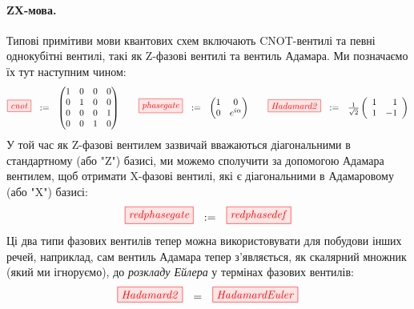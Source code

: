 \documentclass[11pt]{article}
\theoremstyle{definition}
\def\bR{\begin{color}{red}}
\def\e{\end{color}\xspace}
\begin{document}
\paragraph{ZX-мова.} Типові примітиви мови квантових схем включають CNOT-вентилі та певні однокубітні вентилі, такі як Z-фазові вентилі та вентиль Адамара. Ми позначаємо їх тут наступним чином:
\[
\tikzfig{cnot}\ \ :=\ \ \left( \begin{matrix}
  1 & 0 & 0 & 0 \\
  0 & 1 & 0 & 0 \\ 
  0 & 0 & 0 & 1 \\
  0 & 0 & 1 & 0
\end{matrix} \right) 
\qquad
\tikzfig{phasegate}\ \ :=\ \  
\left(\begin{matrix}
1 & 0 \\
0 & e^{i \alpha}
\end{matrix}\right) 
\qquad
\tikzfig{Hadamard2}\ \ :=\ \ 
\textstyle{\frac{1}{\sqrt{2}}}  
\left(
\begin{array}{cr}
  1 & 1 \\
  1 & -1
\end{array}
\right)
\]
У той час як Z-фазові вентилем зазвичай вважаються діагональними в стандартному (або "Z") базисі, ми можемо сполучити за допомогою Адамара вентилем, щоб отримати X-фазові вентилі, які є діагональними в Адамаровому (або "X") базисі:
\[
\tikzfig{redphasegate}\ \ :=\ \ \tikzfig{redphasedef} 
\]
Ці два типи фазових вентилів тепер можна використовувати для побудови інших речей, наприклад, сам вентиль Адамара тепер з'являється, як скалярний множник (який ми ігноруємо), до \textit{розкладу Ейлера} у термінах фазових вентилів:
\[
\tikzfig{Hadamard2}\ \ =\ \ \tikzfig{HadamardEuler}
\]
\end{document}
